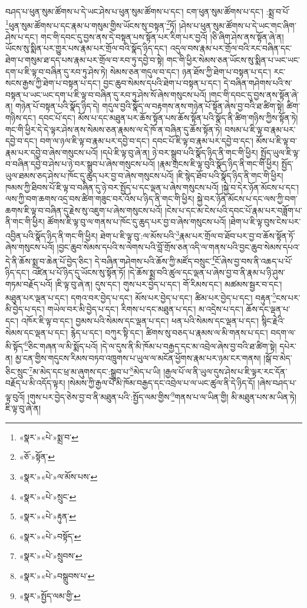 བཤད་པ་ཕུན་སུམ་ཚོགས་པ་དེ་ཡང་ཤེས་པ་ཕུན་སུམ་ཚོགས་པ་དང་། ངག་ཕུན་སུམ་ཚོགས་པ་དང་། :སྨྲ་བ་པོ་\footnote{«སྣར་»«པེ་»སྨྲ་བ་}ཕུན་སུམ་ཚོགས་པ་དང་རྣམ་པ་གསུམ་གྱིས་ཡོངས་སུ་བསྟན་\footnote{«ཅོ་»སྟོན་}ཏོ། །ཤེས་པ་ཕུན་སུམ་ཚོགས་པ་དེ་ཡང་གང་ཞིག་ཤེས་པ་དང་། གང་གི་དབང་དུ་བྱས་ནས་དེ་བསྟན་པས་སྟོན་པར་རིག་པར་བྱའོ། །ཅི་ཞིག་ཤེས་ནས་སྟོན་ཞེ་ན། ཡོངས་སུ་སྨིན་པར་གྱུར་པས་རྣམ་པར་གྲོལ་བའི་སྣོད་ཉིད་དང་། འདུལ་བས་རྣམ་པར་གྲོལ་བའི་རང་བཞིན་དང་ཐེག་པ་གསུམ་ཐ་དད་པས་རྣམ་པར་གྲོལ་བ་རབ་ཏུ་དབྱེ་བ་སྟེ། གང་གི་ཕྱིར་སེམས་ཅན་ཡོངས་སུ་སྨིན་པ་ཡང་ཡང་དག་པ་ཇི་ལྟ་བ་བཞིན་དུ་རབ་ཏུ་ཤེས་ཏེ། སེམས་ཅན་གདུལ་བ་དང་། ཉན་ཐོས་ཀྱི་ཐེག་པ་བསྟན་པ་དང་། རང་སངས་རྒྱས་ཀྱི་ཐེག་པ་བསྟན་པ་དང་། བྱང་ཆུབ་སེམས་དཔའི་ཐེག་པ་བསྟན་པ་དང་། དེ་བཞིན་གཤེགས་པའི་ས་བསྟན་པ་ཡང་ཡང་དག་པ་ཇི་ལྟ་བ་བཞིན་དུ་རབ་ཏུ་ཤེས་སོ་ཞེས་གསུངས་པའོ། །གང་གི་དབང་དུ་བྱས་ནས་སྟོན་ཞེ་ན། གཉེན་པོ་བསྟན་པའི་སྣོད་ཉིད་དེ། གདུལ་བྱའི་སྣོད་ལ་བརྟགས་ནས་གཉེན་པོ་སྟོན་ཞེས་བྱ་བའི་ཐ་ཚིག་སྟེ། ཚིག་གཉིས་དང་། དབང་པོ་དང་། མོས་པ་དང་མཐུན་པར་ཆོས་སྟོན་པས་ཆོས་སྟོན་པའི་སྣོད་ནི་ཚིག་གཉིས་ཀྱིས་སྟོན་ཏེ། གང་གི་ཕྱིར་དེ་དེ་ལྟར་ཤེས་ནས་སེམས་ཅན་རྣམས་ལ་དེ་ཁོ་ན་བཞིན་དུ་ཆོས་སྟོན་ཏེ། བསམ་པ་ཇི་ལྟ་བ་རྣམ་པར་དབྱེ་བ་དང་། བག་ལ་ཉལ་ཇི་ལྟ་བ་རྣམ་པར་དབྱེ་བ་དང་། དབང་པོ་ཇི་ལྟ་བ་རྣམ་པར་དབྱེ་བ་དང་། མོས་པ་ཇི་ལྟ་བ་རྣམ་པར་དབྱེ་བ་ཞེས་གསུངས་པའོ། །དཔེ་ཇི་ལྟ་བུ་ཞེ་ན། ཉེ་བར་སྒྲུབ་པའི་སྣོད་ཉིད་ནི་གང་གི་ཕྱིར། སྤྱོད་ཡུལ་ཇི་ལྟ་བ་བཞིན་དབྱེ་བ་ཤེས་པ་ཉེ་བར་སྒྲུབ་པ་ཞེས་གསུངས་པའོ། །རྣམ་གྲངས་ཇི་ལྟ་བུའི་སྣོད་ཉིད་ནི་གང་གི་ཕྱིར། སྤྱོད་ཡུལ་ཐམས་ཅད་ཤེས་པ་ཁོང་དུ་ཆུད་པར་བྱ་བ་ཞེས་གསུངས་པའོ། །ཇི་སྙེད་ཐོབ་པའི་སྣོད་ཉིད་ནི་གང་གི་ཕྱིར། ཁམས་ཀྱི་ཐིབས་པོ་ཇི་ལྟ་བ་བཞིན་དུ་ཉེ་བར་སྤྱོད་པ་དང་ལྡན་པ་ཞེས་གསུངས་པའོ། །སྐྱེ་བ་དེར་ཉོན་མོངས་པ་དང་། ལས་ཀྱི་བག་ཆགས་འདྲ་བས་ཚིག་གཟུང་བར་འོས་པ་ཉིད་ནི་གང་གི་ཕྱིར། སྐྱེ་བར་ཉོན་མོངས་པ་དང་ལས་ཀྱི་བག་ཆགས་ཇི་ལྟ་བ་བཞིན་དུ་རྗེས་སུ་འཇུག་པ་ཞེས་གསུངས་པའོ། །ངེས་པ་དང་མ་ངེས་པའི་དབང་པོ་རྣམ་པར་བཟློག་པ་ནི་གང་གི་ཕྱིར། ཚོགས་ཇི་ལྟ་བུ་ལ་གནས་པ་ཁོང་དུ་ཆུད་པར་བྱ་བ་ཞེས་གསུངས་པའོ། །ཐེག་པ་ཇི་ལྟ་བུས་ངེས་པར་འབྱིན་པའི་སྣོད་ཉིད་ནི་གང་གི་ཕྱིར། ཐེག་པ་ཇི་ལྟ་བུ་:ལ་མོས་པའི་\footnote{«སྣར་»«པེ་»ལ་མོས་པས་}རྣམ་པར་གྲོལ་བ་ཐོབ་པར་བྱ་བ་ཆོས་སྟོན་ཏོ་ཞེས་གསུངས་པའོ། །བྱང་ཆུབ་སེམས་དཔའི་ས་ལེགས་པའི་བློ་གྲོས་ཅན་འདི་ལ་གནས་པའི་བྱང་ཆུབ་སེམས་དཔའ་དེ་ནི་ཆོས་སྨྲ་བ་ཆེན་པོ་བྱེད་ཅིང་། དེ་བཞིན་གཤེགས་པའི་ཆོས་ཀྱི་མཛོད་བསྲུང་\footnote{«སྣར་»«པེ་»སྲུང་}ངོ་ཞེས་བྱ་བས་ནི་འཆད་པ་པོ་ཉིད་དང་། འཛིན་པ་པོ་ཉིད་དུ་ཡོངས་སུ་སྟོན་ཏོ། །དེ་ཆོས་སྨྲ་བའི་ཚུལ་དང་ལྡན་པ་ཞེས་བྱ་བ་ནི་རྣམ་པ་ཉི་ཤུས་གཏམ་བརྗོད་པའོ། །ཇི་ལྟ་བུ་ཞེ་ན། དུས་དང་། གུས་པར་བྱེད་པ་དང་། གོ་རིམས་དང་། མཚམས་སྦྱར་བ་དང་། མཐུན་པར་ལྡན་པ་དང་། དགའ་བར་བྱེད་པ་དང་། མོས་པར་བྱེད་པ་དང་། ཚིམ་པར་བྱེད་པ་དང་། བརྟུན་\footnote{«སྣར་»«པེ་»རྟུན་}ངས་པར་མི་བྱེད་པ་དང་། གཡེལ་བར་མི་བྱེད་པ་དང་། རིགས་པ་དང་མཐུན་པ་དང་། མ་འདྲེས་པ་དང་། ཆོས་དང་ལྡན་པ་དང་། འཁོར་ཇི་ལྟ་བ་དང་། བྱམས་པའི་སེམས་དང་ལྡན་པ་དང་། ཕན་པའི་སེམས་དང་ལྡན་པ་དང་། སྙིང་རྗེའི་སེམས་དང་ལྡན་པ་དང་། རྙེད་པ་དང་། བཀུར་སྟི་དང་། ཚིགས་སུ་བཅད་པ་རྣམས་ལ་མི་གནས་པ་དང་། བདག་ལ་མི་སྟོད་\footnote{«སྣར་»«པེ་»བསྟོད་}ཅིང་གཞན་ལ་མི་སྨོད་པའོ། །དེ་ལ་དུས་ནི་མི་ཁོམ་པ་བརྒྱད་དང་མ་འབྲེལ་ཞེས་བྱ་བའི་ཐ་ཚིག་སྟེ། དཔེར་ན། མྱ་ངན་གྱིས་གདུངས་རིམས་བཏབ་འཁྲུགས་པ་ཡུལ་ལ་མངོན་ཕྱོགས་རྣམ་པར་ཉམ་ངར་གནས། །སྒོ་བ་མེད་ཅིང་སྲུང་\footnote{«སྣར་»«པེ་»སྲུབས་}མ་མེད་དང་ཕྲ་མ་ཞུགས་དང་:སྒྲུབ་པ་\footnote{«སྣར་»«པེ་»བསྒྲུབས་པ་}མེད་པ་ཡི། །རྒྱལ་པོ་ལ་ནི་ཡུལ་དུས་ཤེས་པ་ཇི་ལྟར་རང་དོན་བརྗོད་པ་མི་འདོད་ལྟར། །སེམས་ཀྱི་རྒྱལ་པོ་མི་ཁོམ་བརྒྱད་དང་འབྲེལ་པ་ལ་ཡང་ཚུལ་ནི་དེ་ཉིད་དོ། །ཞེས་བཤད་པ་ལྟ་བུའོ། །གུས་པར་བྱེད་ཅེས་བྱ་བ་ནི་མཐུན་པའི་:སྤྱོད་ལམ་གྱིས་\footnote{«སྣར་»སྤྱོད་ལམ་གྱི་}གནས་པ་ལ་ཡིན་གྱི། མི་མཐུན་པས་མ་ཡིན་ཏེ། ཇི་ལྟ་བུ་ཞེ་ན། 